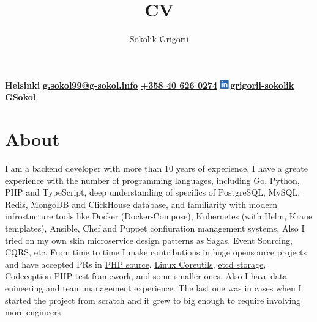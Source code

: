 \documentclass{cv}
\title {CV}
\author{Sokolik Grigorii}
\begin{document}
\maketitle

\begin{topline}
  \textbf{Helsinki}
  \textbf{\href{mailto:g.sokol99@g-sokol.info}{g.sokol99@g-sokol.info}}
  \textbf{\href{tel:+358406260274}{+358 40 626 0274}}
  \textbf{\href{https://www.linkedin.com/in/grigorii-sokolik/}{\includegraphics[height=1em]{li.png}grigorii-sokolik}}
  \textbf{\href{https://github.com/GSokol}{GSokol}}
\end{topline}

\section* {About}
I am a backend developer with more than 10 years of experience. I have a
greate experience with the number of programming languages, including Go,
Python, PHP and TypeScript, deep understanding of specifics of PostgreSQL,
MySQL, Redis, MongoDB and ClickHouse database, and familiarity with modern
infrostucture tools like Docker (Docker-Compose), Kubernetes (with Helm, Krane
templates), Ansible, Chef and Puppet confiuration management systems. Also I
tried on my own skin microservice design patterns as Sagas, Event Sourcing,
CQRS, etc. From time to time I make contributions in huge opensource projects
and have accepted PRs in
\href{https://github.com/php/php-src/pulls?q=is\%3Apr+is\%3Aclosed+author\%3AGSokol}{\underline{PHP source}},
\href{https://github.com/coreutils/coreutils/commits?author=GSokol}{\underline{Linux Coreutils}},
\href{https://github.com/etcd-io/etcd/pulls?q=is\%3Apr+is\%3Aclosed+author\%3AGSokol}{\underline{etcd storage}},
\href{https://github.com/Codeception/Codeception/pulls?q=is\%3Apr+is\%3Aclosed+author\%3AGSokol}{\underline{Codeception PHP test framework}},
and some smaller ones. Also I have data enineering and team management
experience. The last one was in cases when I started the project from scratch
and it grew to big enough to require involving more engineers.
\end{document}
